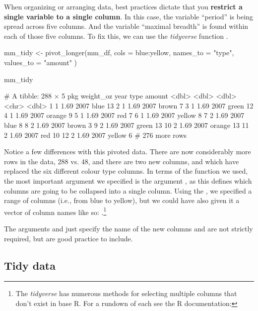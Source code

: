 When organizing or arranging data, best practices dictate that you \textbf{restrict a single variable to a single column}. In this case, the variable ``period'' is being spread across five columns. And the variable ``maximal breadth'' is found within each of those five columns. To fix this, we can use the \textit{tidyverse} function .

\begin{inR}
mm_tidy <- pivot_longer(mm_df,
  cols = blue:yellow,
  names_to = "type", values_to = "amount"
)

mm_tidy
\end{inR}
\begin{outR}
# A tibble: 288 × 5
     pkg weight_oz  year type   amount
   <dbl>     <dbl> <dbl> <chr>   <dbl>
 1     1      1.69  2007 blue       13
 2     1      1.69  2007 brown       7
 3     1      1.69  2007 green      12
 4     1      1.69  2007 orange      9
 5     1      1.69  2007 red         7
 6     1      1.69  2007 yellow      8
 7     2      1.69  2007 blue        8
 8     2      1.69  2007 brown       3
 9     2      1.69  2007 green      13
10     2      1.69  2007 orange     13
11     2      1.69  2007 red        10
12     2      1.69  2007 yellow      6
# 276 more rows
\end{outR}

Notice a few differences with this pivoted data. There are now considerably more rows in the data, 288 vs. 48, and there are two new columns,  and  which have replaced the six different colour type columns. In terms of the  function we used, the most important argument we specified is the argument , as this defines which columns are going to be collapsed into a single column. Using the \R{:}, we specified a range of columns (i.e., from blue to yellow), but we could have also given it a vector of column names like so: .\footnote{The \textit{tidyverse} has numerous methods for selecting multiple columns that don't exist in base R.  For a rundown of each see the R documentation: }

The arguments  and  just specify the name of the new columns and are not strictly required, but are good practice to include.


\subsection{Tidy data}

